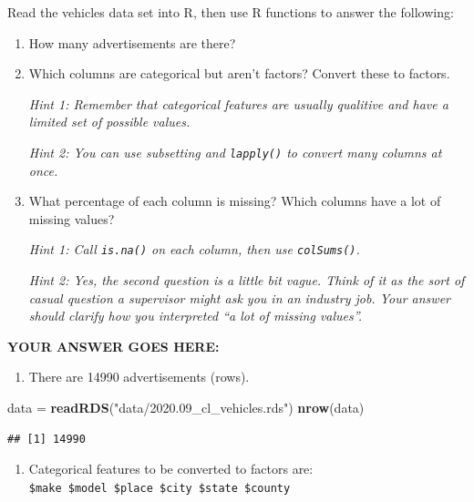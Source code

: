 \documentclass[
]{article}
\newenvironment{Shaded}{\begin{snugshade}}{\end{snugshade}}
\newcommand{\KeywordTok}[1]{\textcolor[rgb]{0.13,0.29,0.53}{\textbf{#1}}}
\newcommand{\NormalTok}[1]{#1}
\newcommand{\StringTok}[1]{\textcolor[rgb]{0.31,0.60,0.02}{#1}}
\providecommand{\tightlist}{%
  \setlength{\itemsep}{0pt}\setlength{\parskip}{0pt}}
\begin{document}
Read the vehicles data set into R, then use R functions to answer the
following:

\begin{enumerate}
\def\labelenumi{\arabic{enumi}.}
\item
  How many advertisements are there?
\item
  Which columns are categorical but aren't factors? Convert these to
  factors.

  \emph{Hint 1: Remember that categorical features are usually qualitive
  and have a limited set of possible values.}

  \emph{Hint 2: You can use subsetting and \texttt{lapply()} to convert
  many columns at once.}
\item
  What percentage of each column is missing? Which columns have a lot of
  missing values?

  \emph{Hint 1: Call \texttt{is.na()} on each column, then use
  \texttt{colSums()}.}

  \emph{Hint 2: Yes, the second question is a little bit vague. Think of
  it as the sort of casual question a supervisor might ask you in an
  industry job. Your answer should clarify how you interpreted ``a lot
  of missing values''.}
\end{enumerate}

\textbf{YOUR ANSWER GOES HERE:}

\begin{enumerate}
\def\labelenumi{\arabic{enumi}.}
\tightlist
\item
  There are 14990 advertisements (rows).
\end{enumerate}

\begin{Shaded}
\begin{Highlighting}[]
\NormalTok{data =}\StringTok{ }\KeywordTok{readRDS}\NormalTok{(}\StringTok{"data/2020.09\_cl\_vehicles.rds"}\NormalTok{)}
\KeywordTok{nrow}\NormalTok{(data)}
\end{Highlighting}
\end{Shaded}

\begin{verbatim}
## [1] 14990
\end{verbatim}

\begin{enumerate}
\def\labelenumi{\arabic{enumi}.}
\setcounter{enumi}{1}
\tightlist
\item
  Categorical features to be converted to factors are:
  \texttt{\$make\ \$model\ \$place\ \$city\ \$state\ \$county}
\end{enumerate}
\end{document}
